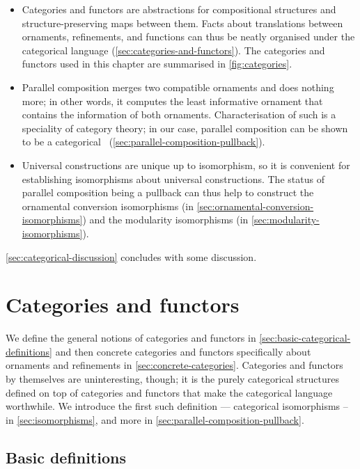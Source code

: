 \begin{itemize}
\item Categories and functors are abstractions for compositional structures and structure-preserving maps between them.
Facts about translations between ornaments, refinements, and functions can thus be neatly organised under the categorical language (\autoref{sec:categories-and-functors}).
The categories and functors used in this chapter are summarised in \autoref{fig:categories}.
\item Parallel composition merges two compatible ornaments and does nothing more; in other words, it computes the least informative ornament that contains the information of both ornaments.
Characterisation of such  is a speciality of category theory; in our case, parallel composition can be shown to be a categorical ~(\autoref{sec:parallel-composition-pullback}).
\item Universal constructions are unique up to isomorphism, so it is convenient for establishing isomorphisms about universal constructions.
The status of parallel composition being a pullback can thus help to construct the ornamental conversion isomorphisms (in \autoref{sec:ornamental-conversion-isomorphisms}) and the modularity isomorphisms (in \autoref{sec:modularity-isomorphisms}).
\end{itemize}
\autoref{sec:categorical-discussion} concludes with some discussion.

\section{Categories and functors}
\label{sec:categories-and-functors}

We define the general notions of categories and functors in \autoref{sec:basic-categorical-definitions} and then concrete categories and functors specifically about ornaments and refinements in \autoref{sec:concrete-categories}.
Categories and functors by themselves are uninteresting, though; it is the purely categorical structures defined on top of categories and functors that make the categorical language worthwhile.
We introduce the first such definition --- categorical isomorphisms -- in \autoref{sec:isomorphisms}, and more in \autoref{sec:parallel-composition-pullback}.

\subsection{Basic definitions}
\label{sec:basic-categorical-definitions}

